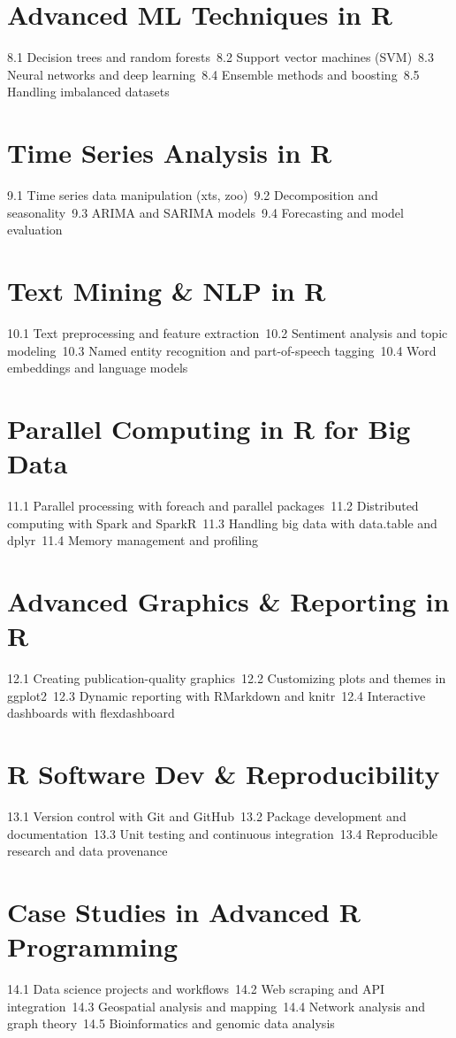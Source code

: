 \section{Advanced ML Techniques in R}
8.1 Decision trees and random forests\
8.2 Support vector machines (SVM)\
8.3 Neural networks and deep learning\
8.4 Ensemble methods and boosting\
8.5 Handling imbalanced datasets\
\section{Time Series Analysis in R}
9.1 Time series data manipulation (xts, zoo)\
9.2 Decomposition and seasonality\
9.3 ARIMA and SARIMA models\
9.4 Forecasting and model evaluation\
\section{Text Mining \& NLP in R}
10.1 Text preprocessing and feature extraction\
10.2 Sentiment analysis and topic modeling\
10.3 Named entity recognition and part-of-speech tagging\
10.4 Word embeddings and language models\
\section{Parallel Computing in R for Big Data}
11.1 Parallel processing with foreach and parallel packages\
11.2 Distributed computing with Spark and SparkR\
11.3 Handling big data with data.table and dplyr\
11.4 Memory management and profiling\
\section{Advanced Graphics \& Reporting in R}
12.1 Creating publication-quality graphics\
12.2 Customizing plots and themes in ggplot2\
12.3 Dynamic reporting with RMarkdown and knitr\
12.4 Interactive dashboards with flexdashboard\
\section{R Software Dev \& Reproducibility}
13.1 Version control with Git and GitHub\
13.2 Package development and documentation\
13.3 Unit testing and continuous integration\
13.4 Reproducible research and data provenance\
\section{Case Studies in Advanced R Programming}
14.1 Data science projects and workflows\
14.2 Web scraping and API integration\
14.3 Geospatial analysis and mapping\
14.4 Network analysis and graph theory\
14.5 Bioinformatics and genomic data analysis\
